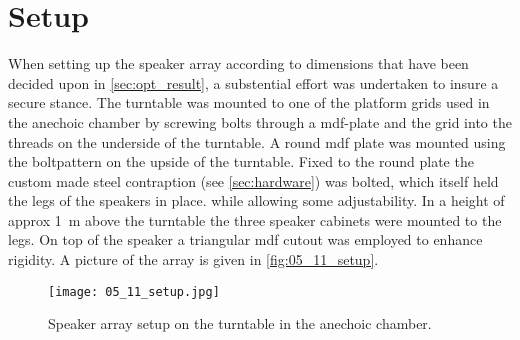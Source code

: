 \section*{Setup}\label{sec:05_11_setup}
When setting up the speaker array according to dimensions that have been decided upon in \autoref{sec:opt_result}, a substential effort was undertaken to insure a secure stance. The turntable was mounted to one of the platform grids used in the anechoic chamber by screwing bolts through a \gls{mdf}-plate and the grid into the threads on the underside of the turntable. A round \gls{mdf} plate was mounted using the boltpattern on the upside of the turntable. Fixed to the round plate the custom made steel contraption (see \autoref{sec:hardware}) was bolted, which itself held the legs of the speakers in place. while allowing some adjustability. In a height of approx \SI{1}{\meter} above the turntable the three speaker cabinets were mounted to the legs. On top of the speaker a triangular \gls{mdf} cutout was employed to enhance rigidity. A picture of the array is given in \autoref{fig:05_11_setup}.

\begin{figure}[h]\label{fig:05_11_setup}
	\centering
    \texttt{[image: 05\_11\_setup.jpg]}
    \caption{Speaker array setup on the turntable in the anechoic chamber.}
\end{figure}

